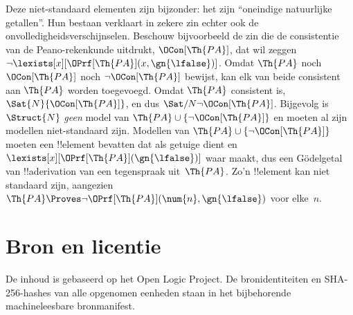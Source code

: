 \documentclass[openany]{memoir}
\begin{document}
Deze niet-standaard elementen zijn bijzonder: het zijn ``oneindige
natuurlijke getallen''. Hun bestaan verklaart in zekere zin echter ook de
onvolledigheidsverschijnselen. Beschouw bijvoorbeeld de zin die de
consistentie van de Peano-rekenkunde uitdrukt, $\OCon[\Th{PA}]$, dat wil
zeggen $\lnot
\lexists[x][\OPrf[\Th{PA}](x, \gn{\lfalse})]$. Omdat $\Th{PA}$ noch
$\OCon[\Th{PA}]$ noch $\lnot \OCon[\Th{PA}]$ bewijst, kan elk van beide
consistent aan $\Th{PA}$ worden toegevoegd. Omdat $\Th{PA}$ consistent is,
$\Sat{N}{\OCon[\Th{PA}]}$, en dus $\Sat/{N}{\lnot
  \OCon[\Th{PA}]}$. Bijgevolg is $\Struct{N}$ \emph{geen} model van
$\Th{PA} \cup \{\lnot \OCon[\Th{PA}]\}$ en moeten al zijn modellen
niet-standaard zijn. Modellen van $\Th{PA} \cup \{\lnot
\OCon[\Th{PA}]\}$ moeten een !!{element} bevatten dat als getuige dient en
$\lexists[x][\OPrf[\Th{PA}](\gn{\lfalse})]$ waar maakt, dus een G\"odelgetal
van !!a{derivation} van een tegenspraak uit~$\Th{PA}$. Zo'n !!{element}
kan niet standaard zijn, aangezien $\Th{PA} \Proves \lnot
\OPrf[\Th{PA}](\num{n}, \gn{\lfalse})$ voor elke~$n$.
\endgroup
\OLEndChapterHook
\OLEndPartHook

\clearpage
\chapter*{Bron en licentie}
De inhoud is gebaseerd op het Open Logic Project. De bronidentiteiten en
SHA-256-hashes van alle opgenomen eenheden staan in het bijbehorende
machineleesbare bronmanifest.


\end{document}

